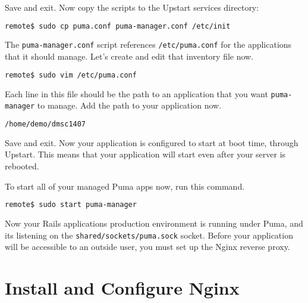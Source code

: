 Save and exit.
Now copy the scripts to the Upstart services directory:

\begin{minipage}{\linewidth}
\begin{lstlisting}[language=bash]
remote$ sudo cp puma.conf puma-manager.conf /etc/init
\end{lstlisting}
\end{minipage}

The \texttt{puma-manager.conf} script references \texttt{/etc/puma.conf}
for the applications that it should manage.
Let's create and edit that inventory file now.

\begin{minipage}{\linewidth}
\begin{lstlisting}[language=bash]
remote$ sudo vim /etc/puma.conf
\end{lstlisting}
\end{minipage}

Each line in this file should be the path to an application that you
want \texttt{puma-manager} to manage.
Add the path to your application now.

\begin{minipage}{\linewidth}
  \begin{lstlisting}[language=bash, caption={/etc/puma.conf}]
/home/demo/dmsc1407
\end{lstlisting}
\end{minipage}

Save and exit. Now your application is configured to start at boot time,
through Upstart. This means that your application will start even after
your server is rebooted.

To start all of your managed Puma apps now, run this command.

\begin{minipage}{\linewidth}
\begin{lstlisting}[language=bash]
remote$ sudo start puma-manager
\end{lstlisting}
\end{minipage}

Now your Rails application\textquotesingle s production environment is running under Puma,
and it\textquotesingle s listening on the \texttt{shared/sockets/puma.sock} socket.
Before your application will be accessible to an outside user,
you must set up the Nginx reverse proxy.

\section{Install and Configure Nginx}

